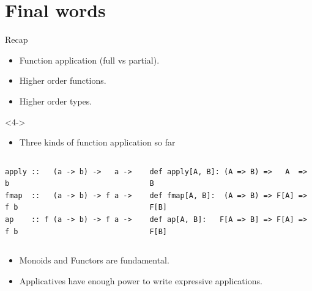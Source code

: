\documentclass[presentation,aspectratio=169,smaller]{beamer}
\begin{document}
\section*{Final words}
\label{sec:org1b8b496}
\begin{frame}[label={sec:org2e98c72},fragile]{Recap}
 \begin{onlyenv}
\begin{itemize}
\item <1-> Function application (full vs partial).
\item <2-> Higher order functions.
\item <3-> Higher order types.
\end{itemize}
\end{onlyenv}

\begin{onlyenv}<4->
\begin{itemize}
\item Three kinds of function application so far
\end{itemize}

\begin{columns}
\begin{column}{0.35\columnwidth}
\begin{verbatim}
apply ::   (a -> b) ->   a ->   b
fmap  ::   (a -> b) -> f a -> f b
ap    :: f (a -> b) -> f a -> f b
\end{verbatim}
\end{column}

\begin{column}{0.35\columnwidth}
\begin{verbatim}
def apply[A, B]: (A => B) =>   A  =>   B
def fmap[A, B]:  (A => B) => F[A] => F[B]
def ap[A, B]:   F[A => B] => F[A] => F[B]
\end{verbatim}
\end{column}
\end{columns}
\end{onlyenv}

\begin{onlyenv}
\begin{itemize}
\item <5-> Monoids and Functors are fundamental.
\item <6-> Applicatives have enough power to write expressive applications.
\end{itemize}
\end{onlyenv}
\end{frame}
\end{document}
